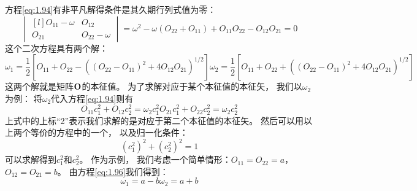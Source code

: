 方程\eqref{eq:1.94}有非平凡解得条件是其久期行列式值为零：
\begin{equation}
 \begin{vmatrix*}[l]
     O_{11}-\omega &O_{12} \\ O_{21} & O_{22}-\omega
 \end{vmatrix*} = \omega^2 - \omega\left(O_{22} + O_{11}\right) + O_{11}O_{22} - O_{12}O_{21} = 0
 \label{eq:1.95}
\end{equation}
这个二次方程具有两个解：
\begin{subequations}
 \begin{equation}
     \omega_1 = \frac{1}{2}\left[
     O_{11} + O_{22} - \left(\left(O_{22}-O_{11}\right)^2+4O_{12}O_{21}\right)^{1/2}
     \right]
     \label{eq:1.96a}
 \end{equation}
 \begin{equation}
     \omega_2 = \frac{1}{2}\left[
     O_{11} + O_{22} + \left(\left(O_{22}-O_{11}\right)^2+4O_{12}O_{21}\right)^{1/2}
     \right]
     \label{eq:1.96b}
 \end{equation}
 \label{eq:1.96}
\end{subequations}
这两个解就是矩阵$\mathbf O$的本征值。
为了求解对应于某个本征值的本征矢，
我们以$\omega_2$为例：
将$\omega_2$代入方程\eqref{eq:1.94}则有
\begin{subequations}
 \begin{equation}
     O_{11}c_1^2 + O_{12}c_2^2 = \omega_2 c_1^2
     \label{eq:1.97a}
 \end{equation}
 \begin{equation}
     O_{21}c_1^2 + O_{22}c_2^2 = \omega_2 c_2^2
     \label{eq:1.97b}
 \end{equation}
 \label{eq:1.97}
\end{subequations}
上式中的上标``2''表示我们求解的是对应于第二个本征值的本征矢。
然后可以用以上两个等价的方程中的一个，
以及归一化条件：
\begin{equation}
 \left(c_1^2\right)^2 + \left(c_2^2\right)^2 = 1
 \label{eq:1.98}
\end{equation}
可以求解得到$c_1^2$和$c_2^2$。
作为示例，
我们考虑一个简单情形：$O_{11} = O_{22} = a$，$O_{12} = O_{21} = b$。
由方程\eqref{eq:1.96}我们得到：
\begin{subequations}
 \begin{equation}
     \omega_1 = a - b
     \label{eq:1.99a}
 \end{equation}
 \begin{equation}
     \omega_2 = a + b
     \label{eq:1.99b}
 \end{equation}
 \label{eq:1.99}
\end{subequations}
